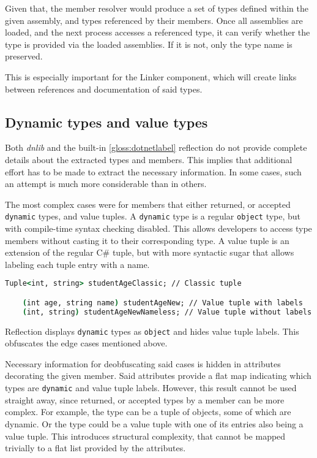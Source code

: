 Given that, the member resolver would produce a set of types defined within the given assembly, and types referenced by their members. Once all assemblies are loaded, and the next process accesses a referenced type, it can verify whether the type is provided via the loaded assemblies. If it is not, only the type name is preserved.

This is especially important for the Linker component, which will create links between references and documentation of said types.

\subsection{Dynamic types and value types}

Both \textit{dnlib} and the built-in \ref{gloss:dotnetlabel} reflection do not provide complete details about the extracted types and members. This implies that additional effort has to be made to extract the necessary information. In some cases, such an attempt is much more considerable than in others.

The most complex cases were for members that either returned, or accepted \lstinline[language=csh]{dynamic} types, and value tuples. A \lstinline[language=csh]{dynamic} type is a regular \lstinline[language=csh]{object} type, but with compile-time syntax checking disabled. This allows developers to access type members without casting it to their corresponding type. A value tuple is an extension of the regular C\# tuple, but with more syntactic sugar that allows labeling each tuple entry with a name.

\begin{lstlisting}[language=csh]
    Tuple<int, string> studentAgeClassic; // Classic tuple

    (int age, string name) studentAgeNew; // Value tuple with labels
    (int, string) studentAgeNewNameless; // Value tuple without labels
\end{lstlisting}

Reflection displays \lstinline[language=csh]{dynamic} types as \lstinline[language=csh]{object} and hides value tuple labels. This obfuscates the edge cases mentioned above.

Necessary information for deobfuscating said cases is hidden in attributes decorating the given member. Said attributes provide a flat map indicating which types are \lstinline[language=csh]{dynamic} and value tuple labels. However, this result cannot be used straight away, since returned, or accepted types by a member can be more complex. For example, the type can be a tuple of objects, some of which are dynamic. Or the type could be a value tuple with one of its entries also being a value tuple. This introduces structural complexity, that cannot be mapped trivially to a flat list provided by the attributes.

